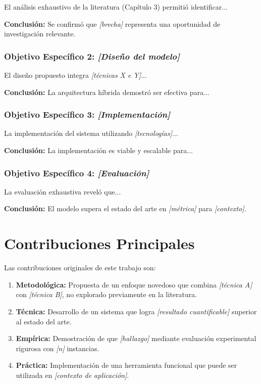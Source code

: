 El análisis exhaustivo de la literatura (Capítulo 3) permitió identificar...

\textbf{Conclusión:} Se confirmó que \textit{[brecha]} representa una oportunidad de investigación relevante.

\subsubsection{Objetivo Específico 2: \textit{[Diseño del modelo]}}

El diseño propuesto integra \textit{[técnicas X e Y]}...

\textbf{Conclusión:} La arquitectura híbrida demostró ser efectiva para...

\subsubsection{Objetivo Específico 3: \textit{[Implementación]}}

La implementación del sistema utilizando \textit{[tecnologías]}...

\textbf{Conclusión:} La implementación es viable y escalable para...

\subsubsection{Objetivo Específico 4: \textit{[Evaluación]}}

La evaluación exhaustiva reveló que...

\textbf{Conclusión:} El modelo supera el estado del arte en \textit{[métrica]} para \textit{[contexto]}.

\section{Contribuciones Principales}
\label{sec:contribuciones}

Las contribuciones originales de este trabajo son:

\begin{enumerate}
    \item \textbf{Metodológica:} Propuesta de un enfoque novedoso que combina \textit{[técnica A]} con \textit{[técnica B]}, no explorado previamente en la literatura.
    
    \item \textbf{Técnica:} Desarrollo de un sistema que logra \textit{[resultado cuantificable]} superior al estado del arte.
    
    \item \textbf{Empírica:} Demostración de que \textit{[hallazgo]} mediante evaluación experimental rigurosa con \textit{[n]} instancias.
    
    \item \textbf{Práctica:} Implementación de una herramienta funcional que puede ser utilizada en \textit{[contexto de aplicación]}.
\end{enumerate}

